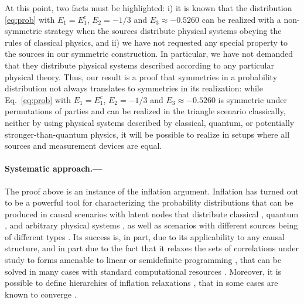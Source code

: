\documentclass[aps,physrev,reprint,superscriptaddress,nofootinbib,twocolumn]{revtex4-2}
\begin{document}
At this point, two facts must be highlighted: i) it is known that the distribution \eqref{eq:prob} with $E_1=E_1^c$, $E_2=-1/3$ and $E_3\approx-0.5260$ can be realized with a non-symmetric strategy when the sources distribute physical systems obeying the rules of classical physics, and ii) we have not requested any special property to the sources in our symmetric construction.
In particular, we have not demanded that they distribute physical systems described according to any particular physical theory.
Thus, our result is a proof that symmetries in a probability distribution not always translates to symmetries in its realization: while Eq.~\eqref{eq:prob} with $E_1=E_1^c$, $E_2=-1/3$ and $E_3\approx-0.5260$ is symmetric under permutations of parties and can be realized in the triangle scenario classically, neither by using physical systems described by classical, quantum, or potentially stronger-than-quantum physics, it will be possible to realize in setups where all sources and measurement devices are equal.

\paragraph*{Systematic approach.---}
The proof above is an instance of the inflation argument.
Inflation has turned out to be a powerful tool for characterizing the probability distributions that can be produced in causal scenarios with latent nodes that distribute classical \cite{wolfe2019,pozas2022b,pozas2023,fraser2018,lauand2024,lauand2023}, quantum \cite{wolfe2021,pozas2023}, and arbitrary physical systems \cite{gisin2020,camillo2023}, as well as scenarios with different sources being of different types \cite{pozas2022,wang2023}.
Its success is, in part, due to its applicability to any causal structure, and in part due to the fact that it relaxes the sets of correlations under study to forms amenable to linear or semidefinite programming \cite{TavakoliPozas2024}, that can be solved in many cases with standard computational resources \cite{boghiu2022,TavakoliPozas2024}.
Moreover, it is possible to define hierarchies of inflation relaxations \cite{navascues2017,wolfe2021,ligthart2023}, that in some cases are known to converge \cite{navascues2017,ligthart2023,ligthart2023b}.
\end{document}
